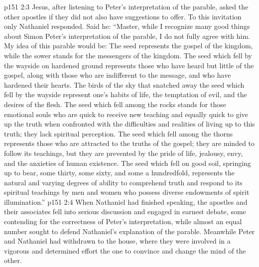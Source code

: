 \vs p151 2:3 Jesus, after listening to Peter’s interpretation of the parable, asked the other apostles if they did not also have suggestions to offer. To this invitation only Nathaniel responded. Said he: “Master, while I recognize many good things about Simon Peter’s interpretation of the parable, I do not fully agree with him. My idea of this parable would be: The seed represents the gospel of the kingdom, while the sower stands for the messengers of the kingdom. The seed which fell by the wayside on hardened ground represents those who have heard but little of the gospel, along with those who are indifferent to the message, and who have hardened their hearts. The birds of the sky that snatched away the seed which fell by the wayside represent one’s habits of life, the temptation of evil, and the desires of the flesh. The seed which fell among the rocks stands for those emotional souls who are quick to receive new teaching and equally quick to give up the truth when confronted with the difficulties and realities of living up to this truth; they lack spiritual perception. The seed which fell among the thorns represents those who are attracted to the truths of the gospel; they are minded to follow its teachings, but they are prevented by the pride of life, jealousy, envy, and the anxieties of human existence. The seed which fell on good soil, springing up to bear, some thirty, some sixty, and some a hundredfold, represents the natural and varying degrees of ability to comprehend truth and respond to its spiritual teachings by men and women who possess diverse endowments of spirit illumination.”
\vs p151 2:4 When Nathaniel had finished speaking, the apostles and their associates fell into serious discussion and engaged in earnest debate, some contending for the correctness of Peter’s interpretation, while almost an equal number sought to defend Nathaniel’s explanation of the parable. Meanwhile Peter and Nathaniel had withdrawn to the house, where they were involved in a vigorous and determined effort the one to convince and change the mind of the other.
